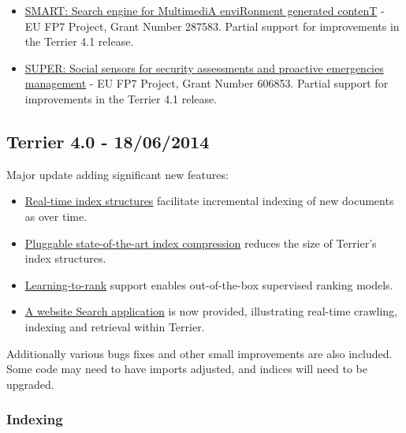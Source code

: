 \begin{itemize}
\tightlist
\item
  \href{http://www.smartfp7.eu/}{SMART: Search engine for MultimediA
  enviRonment generated contenT} - EU FP7 Project, Grant Number 287583.
  Partial support for improvements in the Terrier 4.1 release.
\item
  \href{http://super-fp7.eu}{SUPER: Social sensors for security
  assessments and proactive emergencies management} - EU FP7 Project,
  Grant Number 606853. Partial support for improvements in the Terrier
  4.1 release.
\end{itemize}

\subsection{Terrier 4.0 - 18/06/2014}\label{terrier-4.0---18062014}

Major update adding significant new features:

\begin{itemize}
\tightlist
\item
  \href{realtime_indices.html}{Real-time index structures} facilitate
  incremental indexing of new documents as over time.
\item
  \href{compression.html}{Pluggable state-of-the-art index compression}
  reduces the size of Terrier's index structures.
\item
  \href{learning.html}{Learning-to-rank} support enables out-of-the-box
  supervised ranking models.
\item
  \href{website_search.html}{A website Search application} is now
  provided, illustrating real-time crawling, indexing and retrieval
  within Terrier.
\end{itemize}

Additionally various bugs fixes and other small improvements are also
included. Some code may need to have imports adjusted, and indices will
need to be upgraded.

\subsubsection{Indexing}\label{indexing-1}

